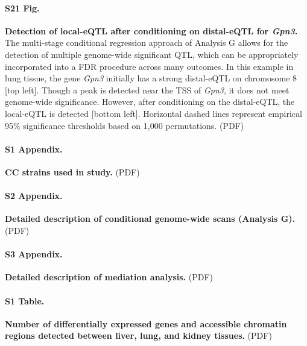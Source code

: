 \documentclass[10pt,letterpaper]{article}
\begin{document}
\paragraph*{S21 Fig.}
\label{S_conditional_scan}
{\bf Detection of local-eQTL after conditioning on distal-eQTL for \textit{Gpn3}.} 
The multi-stage conditional regression approach of Analysis G allows for the detection of multiple genome-wide significant QTL, which can be appropriately incorporated into a FDR procedure across many outcomes. In this example in lung tissue, the gene \textit{Gpn3} initially has a strong distal-eQTL on chromosome 8 [top left]. Though a peak is detected near the TSS of \textit{Gpn3}, it does not meet genome-wide significance. However, after conditioning on the distal-eQTL, the local-eQTL is detected [bottom left]. Horizontal dashed lines represent empirical 95\% significance thresholds based on 1,000 permutations. (PDF)



\paragraph*{S1 Appendix.}
\label{S1_Appendix}
{\bf CC strains used in study.} 
(PDF)

\paragraph*{S2 Appendix.}
\label{S2_Appendix}
{\bf Detailed description of conditional genome-wide scans (Analysis G).}
(PDF)

\paragraph*{S3 Appendix.}
\label{S3_Appendix}
{\bf Detailed description of mediation analysis.}
(PDF)

\paragraph*{S1 Table.}
\label{S_de}
{\bf Number of differentially expressed genes and accessible chromatin regions detected between liver, lung, and kidney tissues.} 
(PDF)
\end{document}
